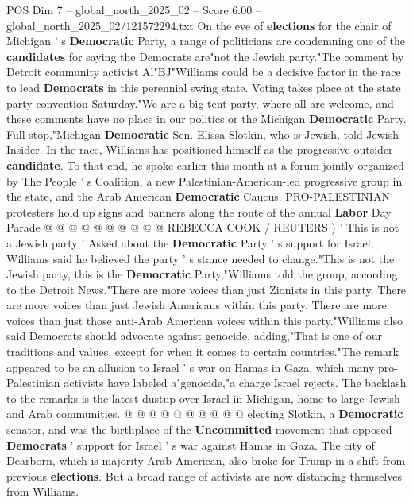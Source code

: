 \begin{textsample}{POS Dim 7 – global\_north\_2025\_02 – Score 6.00 – global\_north\_2025\_02/121572294.txt}  \label{ex:f7_pos_282}
On the eve of \textbf{elections} for the chair of Michigan ' s \textbf{Democratic} Party, a range of politicians are condemning one of the \textbf{candidates} for saying the Democrats are"not the Jewish party."The comment by Detroit community activist Al"BJ"Williams could be a decisive factor in the race to lead \textbf{Democrats} in this perennial swing state.
Voting takes place at the state party convention Saturday."We are a big tent party, where all are welcome, and these comments have no place in our politics or the Michigan \textbf{Democratic} Party.
Full stop,"Michigan \textbf{Democratic} Sen.
Elissa Slotkin, who is Jewish, told Jewish Insider.
In the race, Williams has positioned himself as the progressive outsider \textbf{candidate}.
To that end, he spoke earlier this month at a forum jointly organized by The People ' s Coalition, a new Palestinian-American-led progressive group in the state, and the Arab American \textbf{Democratic} Caucus.
PRO-PALESTINIAN protesters hold up signs and banners along the route of the annual \textbf{Labor} Day Parade @ @ @ @ @ @ @ @ @ @ REBECCA COOK / REUTERS ) ' This is not a Jewish party ' Asked about the \textbf{Democratic} Party ' s support for Israel, Williams said he believed the party ' s stance needed to change."This is not the Jewish party, this is the \textbf{Democratic} Party,"Williams told the group, according to the Detroit News."There are more voices than just Zionists in this party.
There are more voices than just Jewish Americans within this party.
There are more voices than just those anti-Arab American voices within this party."Williams also said Democrats should advocate against genocide, adding,"That is one of our traditions and values, except for when it comes to certain countries."The remark appeared to be an allusion to Israel ' s war on Hamas in Gaza, which many pro-Palestinian activists have labeled a"genocide,"a charge Israel rejects.
The backlash to the remarks is the latest dustup over Israel in Michigan, home to large Jewish and Arab communities. @ @ @ @ @ @ @ @ @ @ electing Slotkin, a \textbf{Democratic} senator, and was the birthplace of the \textbf{Uncommitted} movement that opposed \textbf{Democrats} ' support for Israel ' s war against Hamas in Gaza.
The city of Dearborn, which is majority Arab American, also broke for Trump in a shift from previous \textbf{elections}.
But a broad range of activists are now distancing themselves from Williams.

\end{textsample}
